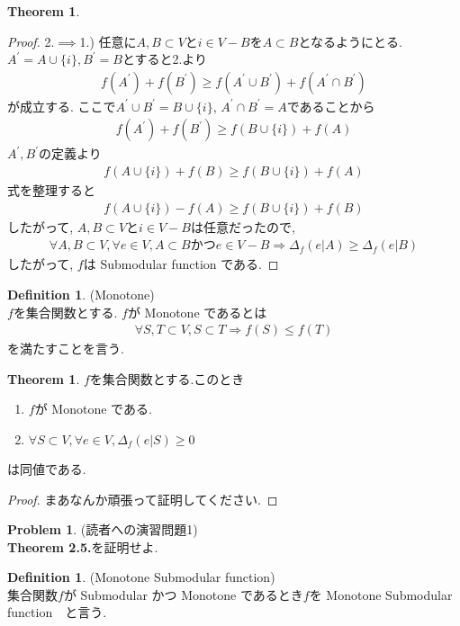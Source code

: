 \documentclass[11pt, a4paper, dvipdfmx]{jsarticle}
\theoremstyle{definition}
\newtheorem{Definition+}[Axiom+]{Definition}
\newtheorem{Theorem+}[Axiom+]{Theorem}
\newtheorem{Problem+}[Axiom+]{Problem}
\begin{document}
\begin{Theorem+}
\begin{proof}
        2.$\implies$1.) 任意に$A, B\subset V$と$i\in V - B$を$A\subset B$となるようにとる. $A^{'} = A\cup \{i\}, B^{'} = B$とすると2.より
        \begin{align*}
            f(A^{'}) + f(B^{'})\geq f(A^{'}\cup B^{'}) + f(A^{'}\cap B^{'})
        \end{align*}
        が成立する. ここで$A^{'}\cup B^{'} = B\cup\{i\}$, $A^{'}\cap B^{'} = A$であることから
        \begin{align*}
            f(A^{'}) + f(B^{'})\geq f(B\cup\{i\}) + f(A)
        \end{align*}
        $A^{'}, B^{'}$の定義より
        \begin{align*}
            f(A\cup \{i\}) + f(B)\geq f(B\cup\{i\}) + f(A)
        \end{align*}
        式を整理すると
        \begin{align*}
            f(A\cup \{i\}) - f(A)\geq f(B\cup\{i\}) + f(B)
        \end{align*}
        したがって, $A, B\subset V$と$i\in V - B$は任意だったので,
        \begin{align*}
            \forall A, B\subset V, \forall e\in V,A\subset B かつe\in V - B\Longrightarrow \Delta_{f}(e | A)\geq\Delta_{f}(e | B)
        \end{align*}
        したがって, $f$は Submodular function である.
    \end{proof}
\end{Theorem+}
\begin{Definition+}(Monotone)\\
    $f$を集合関数とする. $f$が Monotone であるとは
    \begin{align*}
        \forall S, T\subset V, S\subset T\Longrightarrow f(S)\leq f(T)
    \end{align*}
    を満たすことを言う.
\end{Definition+}
\begin{Theorem+}
    $f$を集合関数とする.このとき
    \begin{enumerate}
        \item $f$が Monotone である.
        \item $\forall S\subset V, \forall e\in V, \Delta_{f}(e | S)\geq 0$
    \end{enumerate}
    は同値である.
    \begin{proof}
        まあなんか頑張って証明してください.
    \end{proof}
\end{Theorem+}
\begin{Problem+}(読者への演習問題1)\\
    {\bf Theorem 2.5.}を証明せよ.
\end{Problem+}
\begin{Definition+}(Monotone Submodular function)\\
    集合関数$f$が Submodular かつ Monotone であるとき$f$を Monotone Submodular function　と言う.
\end{Definition+}
\end{document}
